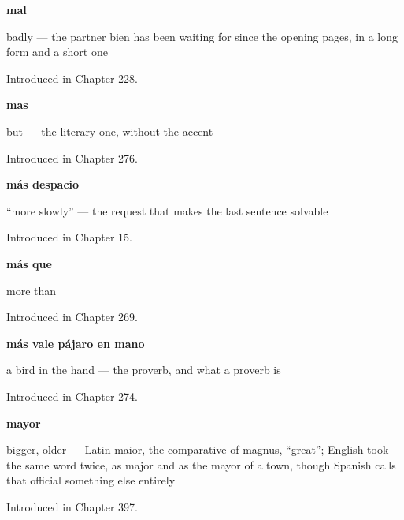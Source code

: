 \noindent\begin{minipage}[t]{\linewidth}
\raggedright
\textbf{mal}\par
\small badly — the partner bien has been waiting for since the opening pages, in a long form and a short one\par
\footnotesize Introduced in Chapter 228.
\end{minipage}\par\medskip

\noindent\begin{minipage}[t]{\linewidth}
\raggedright
\textbf{mas}\par
\small but — the literary one, without the accent\par
\footnotesize Introduced in Chapter 276.
\end{minipage}\par\medskip

\noindent\begin{minipage}[t]{\linewidth}
\raggedright
\textbf{más despacio}\par
\small \textquotedblleft{}more slowly\textquotedblright{} — the request that makes the last sentence solvable\par
\footnotesize Introduced in Chapter 15.
\end{minipage}\par\medskip

\noindent\begin{minipage}[t]{\linewidth}
\raggedright
\textbf{más que}\par
\small more than\par
\footnotesize Introduced in Chapter 269.
\end{minipage}\par\medskip

\noindent\begin{minipage}[t]{\linewidth}
\raggedright
\textbf{más vale pájaro en mano}\par
\small a bird in the hand — the proverb, and what a proverb is\par
\footnotesize Introduced in Chapter 274.
\end{minipage}\par\medskip

\noindent\begin{minipage}[t]{\linewidth}
\raggedright
\textbf{mayor}\par
\small bigger, older — Latin maior, the comparative of magnus, \textquotedblleft{}great\textquotedblright{}; English took the same word twice, as major and as the mayor of a town, though Spanish calls that official something else entirely\par
\footnotesize Introduced in Chapter 397.
\end{minipage}\par\medskip

